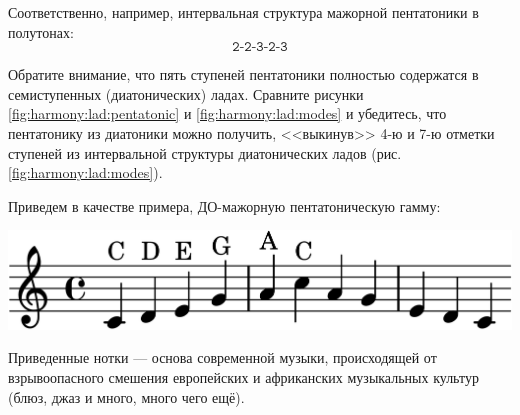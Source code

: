 Соответственно, например, интервальная структура мажорной пентатоники в полутонах:
\[
    \texttt{2-2-3-2-3}
\]

Обратите внимание, что пять ступеней пентатоники полностью содержатся в семиступенных (диатонических) ладах. Сравните рисунки \ref{fig:harmony:lad:pentatonic} и \ref{fig:harmony:lad:modes} и убедитесь, что пентатонику из диатоники можно получить, <<выкинув>> 4-ю и 7-ю отметки ступеней из интервальной структуры диатонических ладов (рис. \ref{fig:harmony:lad:modes}).

Приведем в качестве примера, ДО-мажорную пентатоническую гамму:
\begin{center}    
    \includegraphics{fig/notes/scale-penta-c-maj}
\end{center}    

Приведенные нотки --- основа современной музыки, происходящей от взрывоопасного смешения европейских и африканских музыкальных культур (блюз, джаз и много, много чего ещё).